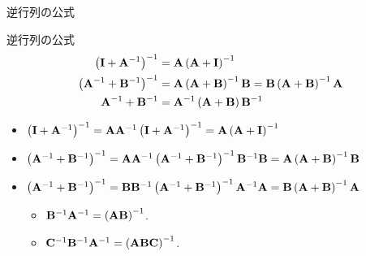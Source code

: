 \documentclass[dvipdfmx,notheorems,t]{beamer}
\begin{document}
\begin{frame}{逆行列の公式}
\begin{block}{逆行列の公式}
  \begin{align*}
    \left( \vb{I} + \vb{A}^{-1} \right)^{-1} &= \vb{A} \left( \vb{A} + \vb{I} \right)^{-1} \\
    \left( \vb{A}^{-1} + \vb{B}^{-1} \right)^{-1}
      &= \vb{A} \left( \vb{A} + \vb{B} \right)^{-1} \vb{B}
      = \vb{B} \left( \vb{A} + \vb{B} \right)^{-1} \vb{A} \\
    \vb{A}^{-1} + \vb{B}^{-1} &= \vb{A}^{-1} \left( \vb{A} + \vb{B} \right) \vb{B}^{-1}
  \end{align*}
\end{block}

\begin{itemize}
  \item $\left( \vb{I} + \vb{A}^{-1} \right)^{-1}
    = \vb{A} \vb{A}^{-1} \left( \vb{I} + \vb{A}^{-1} \right)^{-1}
    = \vb{A} \left( \vb{A} + \vb{I} \right)^{-1}$
  \item $\left( \vb{A}^{-1} + \vb{B}^{-1} \right)^{-1}
    = \vb{A} \vb{A}^{-1} \left( \vb{A}^{-1} + \vb{B}^{-1} \right)^{-1} \vb{B}^{-1} \vb{B}
    = \vb{A} \left( \vb{A} + \vb{B} \right)^{-1} \vb{B}$
  \item $\left( \vb{A}^{-1} + \vb{B}^{-1} \right)^{-1}
    = \vb{B} \vb{B}^{-1} \left( \vb{A}^{-1} + \vb{B}^{-1} \right)^{-1} \vb{A}^{-1} \vb{A}
    = \vb{B} \left( \vb{A} + \vb{B} \right)^{-1} \vb{A}$
  \begin{itemize}
    \item $\vb{B}^{-1} \vb{A}^{-1} = \left( \vb{A} \vb{B} \right)^{-1}$.
    \item $\vb{C}^{-1} \vb{B}^{-1} \vb{A}^{-1} = \left( \vb{A} \vb{B} \vb{C} \right)^{-1}$.
  \end{itemize}
\end{itemize}
\end{frame}
\end{document}
